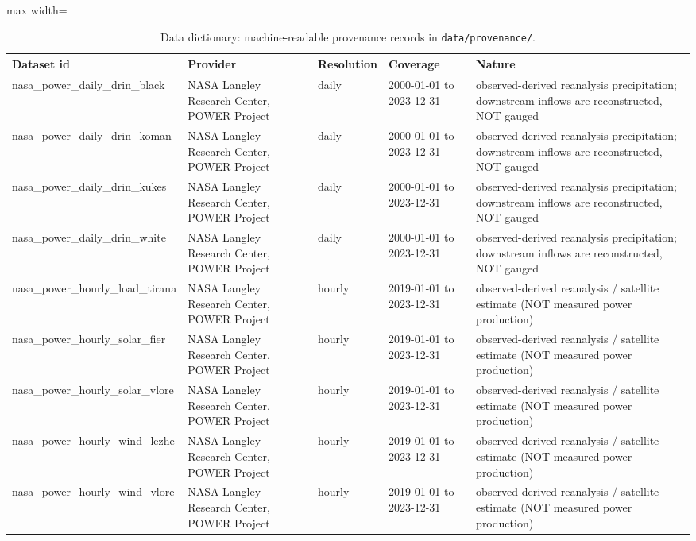 \begin{table}[htbp]
\centering
\scriptsize
\caption{Data dictionary: machine-readable provenance records in \texttt{data/provenance/}.}
\label{tab:data-dictionary}
\begin{adjustbox}{max width=\linewidth}
\begin{tabular}{lp{3.4cm}p{1.3cm}p{2.6cm}p{4.2cm}}
\toprule
Dataset id & Provider & Resolution & Coverage & Nature \\
\midrule
nasa\_power\_daily\_drin\_black & NASA Langley Research Center, POWER Project & daily & 2000-01-01 to 2023-12-31 & observed-derived reanalysis precipitation; downstream inflows are reconstructed, NOT gauged \\
nasa\_power\_daily\_drin\_koman & NASA Langley Research Center, POWER Project & daily & 2000-01-01 to 2023-12-31 & observed-derived reanalysis precipitation; downstream inflows are reconstructed, NOT gauged \\
nasa\_power\_daily\_drin\_kukes & NASA Langley Research Center, POWER Project & daily & 2000-01-01 to 2023-12-31 & observed-derived reanalysis precipitation; downstream inflows are reconstructed, NOT gauged \\
nasa\_power\_daily\_drin\_white & NASA Langley Research Center, POWER Project & daily & 2000-01-01 to 2023-12-31 & observed-derived reanalysis precipitation; downstream inflows are reconstructed, NOT gauged \\
nasa\_power\_hourly\_load\_tirana & NASA Langley Research Center, POWER Project & hourly & 2019-01-01 to 2023-12-31 & observed-derived reanalysis / satellite estimate (NOT measured power production) \\
nasa\_power\_hourly\_solar\_fier & NASA Langley Research Center, POWER Project & hourly & 2019-01-01 to 2023-12-31 & observed-derived reanalysis / satellite estimate (NOT measured power production) \\
nasa\_power\_hourly\_solar\_vlore & NASA Langley Research Center, POWER Project & hourly & 2019-01-01 to 2023-12-31 & observed-derived reanalysis / satellite estimate (NOT measured power production) \\
nasa\_power\_hourly\_wind\_lezhe & NASA Langley Research Center, POWER Project & hourly & 2019-01-01 to 2023-12-31 & observed-derived reanalysis / satellite estimate (NOT measured power production) \\
nasa\_power\_hourly\_wind\_vlore & NASA Langley Research Center, POWER Project & hourly & 2019-01-01 to 2023-12-31 & observed-derived reanalysis / satellite estimate (NOT measured power production) \\

\end{tabular}
\end{adjustbox}
\end{table}
